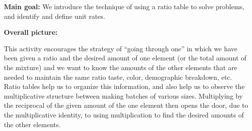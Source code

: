 \documentclass[nooutcomes,noauthor,handout]{ximera}
\begin{document}
\newpage
\begin{instructorNotes}

{\bf Main goal:} We introduce the technique of using a ratio table to solve problems, and identify and define unit rates.

{\bf Overall picture:}

This activity encourages the strategy of ``going through one'' in which we have been given a ratio and the desired amount of one element (or the total amount of the mixture) and we want to know the amounts of the other elements that are needed to maintain the same ratio taste, color, demographic breakdown, etc.   Ratio tables help us to organize this information, and also help us to observe the multiplicative structure between making batches of various sizes. Multiplying by the reciprocal of the given amount of the one element then opens the door, due to the multiplicative identity, to using multiplication to find the desired amounts of the other elements.


\end{instructorNotes}
\end{document}
